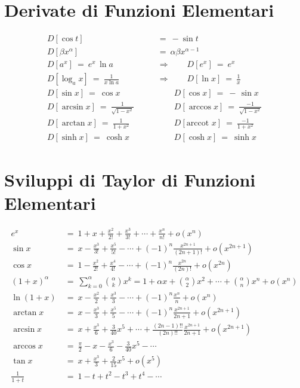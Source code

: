 \documentclass[12pt, twoside, italian]{book}
\begin{document}
 	\section*{Derivate di Funzioni Elementari}
 	\[
 	\begin{aligned}
 		D[\cos t]\ &=\ -\sin t \\ 
 		D[\beta x^\alpha]\ &=\ \alpha \beta x^{\alpha-1} \\
 		D[a^x]\ =\ e^x\, \ln a \qquad &\Rightarrow \qquad D[e^x]\ =\ e^x \\
 		D[\log_a x]\ =\ \frac{1}{x \ln a} \qquad &\Rightarrow \qquad D[\ln x]\ =\ \frac{1}{x} \\
 		D[\sin x]\ =\ \cos x \qquad &\qquad D[\cos x]\ =\ -\,\sin x \\
 		D[\arcsin x]\ =\ \frac{1}{\sqrt{1 - x^2}} \qquad &\qquad D[\arccos x]\ =\ \frac{-1}{\sqrt{1 - x^2}} \\
 		D[\arctan x]\ =\ \frac{1}{1 + x^2} \qquad &\qquad D[\text{arccot } x]\ =\ \frac{-1}{1 + x^2} \\
 		D[\sinh x]\ =\ \cosh x \qquad &\qquad D[\cosh x]\ =\ \sinh x
 	\end{aligned}
 	\]
 	
 	\section*{Sviluppi di Taylor di Funzioni Elementari}
 	\[
 	\begin{aligned}
 		e^x\ &=\ 1 + x + \frac{x^2}{2!} + \frac{x^3}{3!} + \cdots + \frac{x^n}{n!} + o(x^n) \\
 		\sin x\ &=\ x - \frac{x^3}{3!} + \frac{x^5}{5!} - \cdots + (-1)^n \frac{x^{2n+1}}{(2n+1)!} + o(x^{2n+1}) \\
 		\cos x\ &=\ 1 - \frac{x^2}{2!} + \frac{x^4}{4!} - \cdots + (-1)^n \frac{x^{2n}}{(2n)!} + o(x^{2n}) \\
 		(1+x)^\alpha\ &=\ \sum_{k=0}^\alpha \binom{\alpha}{k} x^k = 1 + \alpha x + \binom{\alpha}{2} x^2 + \cdots + \binom{\alpha}{n} x^n + o(x^n) \\
 		\ln(1+x)\ &=\ x - \frac{x^2}{2} + \frac{x^3}{3} - \cdots + (-1)^n \frac{x^n}{n} + o(x^n) \\
 		\arctan x\ &=\ x - \frac{x^3}{3} + \frac{x^5}{5} - \cdots + (-1)^n \frac{x^{2n+1}}{2n+1} + o(x^{2n+1}) \\
 		\arcsin x\ &=\ x + \frac{x^3}{6} + \frac{3}{40} x^5 + \cdots + \frac{(2n-1)!!}{(2n)!!} \frac{x^{2n+1}}{2n+1} + o(x^{2n+1}) \\
 		\arccos x\ &=\ \frac{\pi}{2} - x - \frac{x^3}{6} - \frac{3}{40} x^5 - \cdots \\
 		\tan x\ &=\ x + \frac{x^3}{3} + \frac{2}{15} x^5 + o(x^5) \\
 		\frac{1}{1+t}\ &=\ 1 - t + t^2 - t^3 + t^4 - \cdots
 	\end{aligned}
 	\]
 	\vspace{0.5cm}
\end{document}

